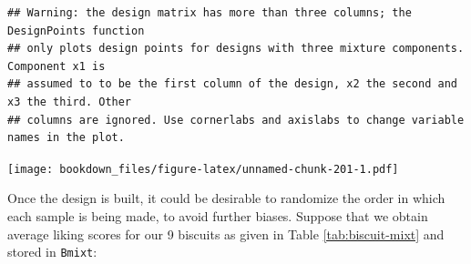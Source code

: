 \documentclass[
]{krantz}
\makeatletter
\newenvironment{Shaded}{\begin{snugshade}}{\end{snugshade}}
\newcommand{\AttributeTok}[1]{\textcolor[rgb]{0.61,0.61,0.61}{#1}}
\newcommand{\ConstantTok}[1]{\textcolor[rgb]{0,0,0}{#1}}
\newcommand{\DecValTok}[1]{\textcolor[rgb]{0.06,0.06,0.06}{#1}}
\newcommand{\FunctionTok}[1]{\textcolor[rgb]{0,0,0}{#1}}
\newcommand{\NormalTok}[1]{#1}
\newcommand{\OtherTok}[1]{\textcolor[rgb]{0.37,0.37,0.37}{#1}}
\newcommand{\SpecialCharTok}[1]{\textcolor[rgb]{0,0,0}{#1}}
\newcommand{\StringTok}[1]{\textcolor[rgb]{0.5,0.5,0.5}{#1}}
\newenvironment{kframe}{%
\medskip{}
\setlength{\fboxsep}{.8em}
 \def\at@end@of@kframe{}%
 \ifinner\ifhmode%
  \def\at@end@of@kframe{\end{minipage}}%
  \begin{minipage}{\columnwidth}%
 \fi\fi%
 \def\FrameCommand##1{\hskip\@totalleftmargin \hskip-\fboxsep
 \colorbox{shadecolor}{##1}\hskip-\fboxsep
     \hskip-\linewidth \hskip-\@totalleftmargin \hskip\columnwidth}%
 \MakeFramed {\advance\hsize-\width
   \@totalleftmargin\z@ \linewidth\hsize
   \@setminipage}}%
 {\par\unskip\endMakeFramed%
 \at@end@of@kframe}
\renewenvironment{Shaded}{\begin{kframe}}{\end{kframe}}
\makeatother
\begin{document}
\begin{Shaded}
\end{Shaded}

\begin{verbatim}
## Warning: the design matrix has more than three columns; the DesignPoints function  
## only plots design points for designs with three mixture components. Component x1 is 
## assumed to to be the first column of the design, x2 the second and x3 the third. Other 
## columns are ignored. Use cornerlabs and axislabs to change variable names in the plot.
\end{verbatim}

\texttt{[image: bookdown\_files/figure-latex/unnamed-chunk-201-1.pdf]}

Once the design is built, it could be desirable to randomize the order in which each sample is being made, to avoid further biases. Suppose that we obtain average liking scores for our 9 biscuits as given in Table \ref{tab:biscuit-mixt} and stored in \texttt{Bmixt}:
\end{document}
